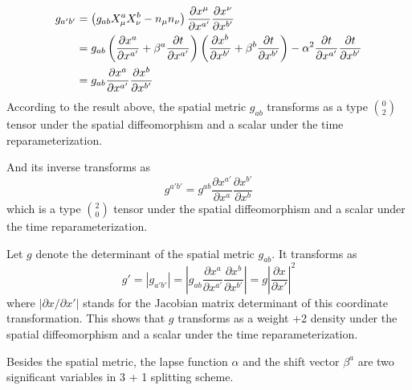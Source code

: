 \documentclass[letterpaper,nofootinbib,prd,amsmath,onecolumn]{revtex4-1}
\begin{document}
\begin{align}
g_{a'b'} & = \left(g_{ab}X^{a}_{\mu}X^{b}_{\nu} - n_{\mu}n_{\nu}\right)\frac{\partial x^{\mu}}{\partial x^{a'}}\frac{\partial x^{\nu}}{\partial x^{b'}}\notag\\
&= g_{ab}\left(\frac{\partial x^{a}}{\partial x^{a'}} + \beta^{a}\frac{\partial t}{\partial x^{a'}}\right)\left(\frac{\partial x^{b}}{\partial x^{b'}} + \beta^{b}\frac{\partial t}{\partial x^{b'}}\right) - \alpha^2\frac{\partial t}{\partial x^{a'}}\frac{\partial t}{\partial x^{b'}}\notag\\
& = g_{ab}\frac{\partial x^{a}}{\partial x^{a'}}\frac{\partial x^{b}}{\partial x^{b'}}
\end{align}
According to the result above, the spatial metric $g_{ab}$ transforms as a type $0 \choose 2$ tensor under the spatial diffeomorphism and a scalar under the time reparameterization.

And its inverse transforms as
\begin{equation}
g^{a'b'} = g^{ab}\frac{\partial x^{a'}}{\partial x^{a}}\frac{\partial x^{b'}}{\partial x^{b}}\label{spatial metric}
\end{equation}
which is a type $2 \choose 0$ tensor under the spatial diffeomorphism and a scalar under the time reparameterization. 

Let $g$ denote the determinant of the spatial metric $g_{ab}$. It transforms as
\begin{equation}
g' = \left|g_{a'b'}\right| = \left|g_{ab}\frac{\partial x^{a}}{\partial x^{a'}}\frac{\partial x^{b}}{\partial x^{b'}}\right|  = g\left|\frac{\partial x}{\partial x'}\right|^{2}
\end{equation}
where $\left|\partial x/\partial x'\right|$ stands for the Jacobian matrix determinant of this coordinate transformation. This shows that $g$ transforms as a weight +2 density under the spatial diffeomorphism and a scalar under the time reparameterization. 
 
Besides the spatial metric, the lapse function $\alpha$ and the shift vector $\beta^{a}$ are two significant variables in 3 + 1 splitting scheme. 
\end{document}
